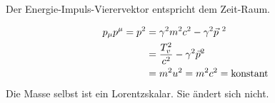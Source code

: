 \begin{bemerkung*}
	Der Energie-Impuls-Vierervektor entspricht dem Zeit-Raum.
\end{bemerkung*}

\begin{align*}
	p_\mu p^\mu = p^2 &= \gamma^2 m^2 c^2 - \gamma^2 \vec{p}^{~2}\\
	&= \frac{T_v^2}{c^2} - \gamma^2 \vec{p}^2\\
	&= m^2 u^2 = m^2 c^2 = \text{konstant}
\end{align*}
Die Masse selbst ist ein Lorentzskalar. Sie ändert sich nicht.

